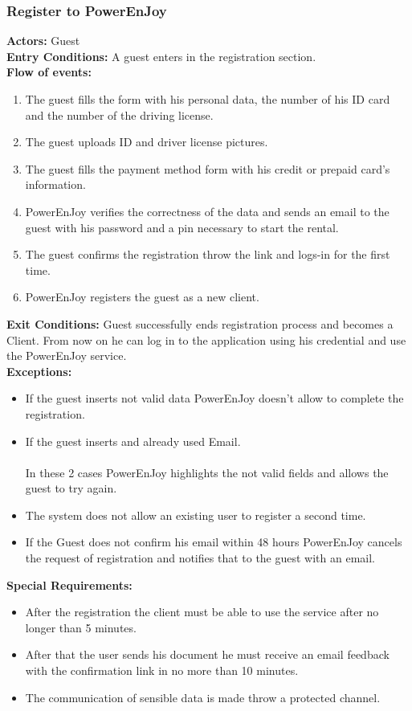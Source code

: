 \subsubsection{Register to PowerEnJoy}
%
\textbf{Actors:}
Guest\\
%
\textbf{Entry Conditions:}
A guest enters in the registration section.\\ 
%
\textbf{Flow of events:}
\begin{enumerate}
\item The guest fills the form with his personal data, the number of his ID card and the number of the driving license. 
\item The guest uploads ID and driver license pictures.
\item  The guest fills the payment method form with his credit or prepaid card's information. 
\item PowerEnJoy verifies the correctness of the data and sends an email to the guest with his password and a pin necessary to start the rental. 
\item The guest confirms the registration throw the link and logs-in for the first time.
\item PowerEnJoy registers the guest as a new client. 
\end{enumerate}
%
\textbf{Exit Conditions:}
Guest successfully ends registration process and becomes a Client. From now on he can log in to the application using his credential and use the PowerEnJoy service. \\ 
%
\textbf{Exceptions:}
\begin{itemize}
\item If the guest inserts not valid data PowerEnJoy doesn't allow to complete the registration.
\item If the guest inserts and already used Email.
\\
\\In these 2 cases PowerEnJoy highlights the not valid fields and allows the guest to try again.
\item The system does not allow an existing user to register a second time.
\item If the Guest does not confirm his email within 48 hours PowerEnJoy cancels the request of registration and notifies that to the guest with an email.
\end{itemize}
%
\textbf{Special Requirements:}
\begin{itemize}
\item After the registration the client must be able to use the service after no longer than 5 minutes.
\item After that the user sends his document he must receive an email feedback with the confirmation link in no more than 10 minutes.
\item The communication of sensible data is made throw a protected channel.
\end{itemize}

